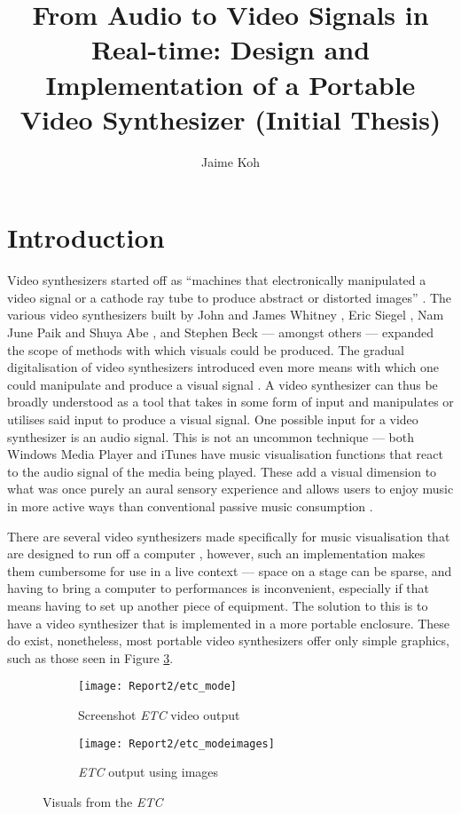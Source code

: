 \documentclass{report}
\title{From Audio to Video Signals in Real-time: Design and Implementation of a Portable Video Synthesizer (Initial Thesis)}
\author{Jaime Koh}
\begin{document}
\newpage
\maketitle
\tableofcontents
\newpage

\section*{Introduction}
\markright{}
Video synthesizers started off as ``machines that electronically manipulated a video signal or a cathode ray tube to produce abstract or distorted images'' \cite{Collopy2014}. The various video synthesizers built by John and James Whitney \cite{Patterson2009}, Eric Siegel \cite{ElectronicArtsIntermix}, Nam June Paik and Shuya Abe \cite{Furlong1983}, and Stephen Beck \cite{Beck1992} --- amongst others --- expanded the scope of methods with which visuals could be produced. The gradual digitalisation of video synthesizers introduced even more means with which one could manipulate and produce a visual signal \cite{Collopy2014}. A video synthesizer can thus be broadly understood as a tool that takes in some form of input and manipulates or utilises said input to produce a visual signal. One possible input for a video synthesizer is an audio signal. This is not an uncommon technique --- both Windows Media Player and iTunes have music visualisation functions that react to the audio signal of the media being played. These add a visual dimension to what was once purely an aural sensory experience and allows users to enjoy music in more active ways than conventional passive music consumption \cite{Casey2008}. \par

There are several video synthesizers made specifically for music visualisation that are designed to run off a computer \cite{Casey2008}, however, such an implementation makes them cumbersome for use in a live context --- space on a stage can be sparse, and having to bring a computer to performances is inconvenient, especially if that means having to set up another piece of equipment. The solution to this is to have a video synthesizer that is implemented in a more portable enclosure. These do exist, nonetheless, most portable video synthesizers offer only simple graphics, such as those seen in Figure \ref{fig:etc}.

\begin{figure}[b]
  \begin{subfigure}{0.5\textwidth}
  \texttt{[image: Report2/etc\_mode]}
  \caption{Screenshot \textit{ETC} video output}
  \label{fig:etc_mode}
\end{subfigure}
\begin{subfigure}{0.5\textwidth}
  \texttt{[image: Report2/etc\_modeimages]}
  \caption{\textit{ETC} output using images}
  \label{fig:etc_modeimages}
\end{subfigure}
\caption{Visuals from the \textit{ETC}}
\label{fig:etc}
\end{figure}
\end{document}
